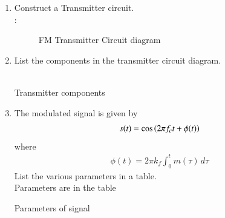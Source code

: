 \begin{enumerate}[label=\arabic*.,ref=\thesection.\theenumi]
\item Construct a Transmitter circuit.
\\
\solution:
\begin{figure}[H]
\centering
  
  \caption{FM Transmitter Circuit diagram}
  \label{ckt:circuit_2}
\end{figure}
\item List the components in the transmitter circuit diagram.\\
\solution \\
\begin{table}[!ht]
  \centering
  
  \caption{Transmitter components}
  \label{tab:tab_2}
\end{table}
\item The modulated signal is given by 
\begin{align}
	s(t) = \cos\left(2\pi f_c t + \phi(t)\right)
\end{align}
where
\begin{align}
	\phi(t) = 2\pi k_f \int_{0}^{t}m(\tau)\,d\tau
	\label{4.2.2.2}
\end{align}
List the various parameters in a table.
\\
\solution
Parameters are in the table %
\vspace{10mm}
\begin{table}[!ht]
  \centering
  
  \caption{Parameters of signal}
  \label{tab:tab_1}
\end{table}


\end{enumerate}
